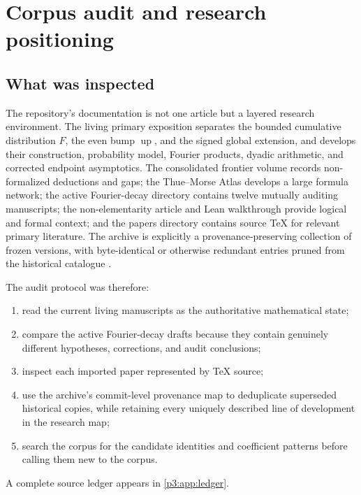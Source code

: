 \documentclass[11pt,oneside]{article}
\numberwithin{equation}{section}
\theoremstyle{definition}
\theoremstyle{remark}
\newcommand{\Up}{\operatorname{up}}
\begin{document}
\tableofcontents
\clearpage

\section{Corpus audit and research positioning}
\label{p3:sec:audit}

\subsection{What was inspected}

The repository's documentation is not one article but a layered research environment.  The
living primary exposition separates the bounded cumulative distribution $F$, the even bump
$\Up$, and the signed global extension, and develops their construction, probability model,
Fourier products, dyadic arithmetic, and corrected endpoint asymptotics.  The consolidated
frontier volume records non-formalized deductions and gaps; the Thue--Morse Atlas develops a
large formula network; the active Fourier-decay directory contains twelve mutually auditing
manuscripts; the non-elementarity article and Lean walkthrough provide logical and formal
context; and the papers directory contains source TeX for relevant primary literature.
The archive is explicitly a provenance-preserving collection of frozen versions, with
byte-identical or otherwise redundant entries pruned from the historical catalogue
\cite{p3:proveit-primary,p3:proveit-frontiers,p3:proveit-atlas,p3:proveit-fourier,p3:proveit-archive}.

The audit protocol was therefore:
\begin{enumerate}
\item read the current living manuscripts as the authoritative mathematical state;
\item compare the active Fourier-decay drafts because they contain genuinely different
      hypotheses, corrections, and audit conclusions;
\item inspect each imported paper represented by TeX source;
\item use the archive's commit-level provenance map to deduplicate superseded historical
      copies, while retaining every uniquely described line of development in the research map;
\item search the corpus for the candidate identities and coefficient patterns before calling
      them new to the corpus.
\end{enumerate}
A complete source ledger appears in \cref{p3:app:ledger}.
\end{document}
